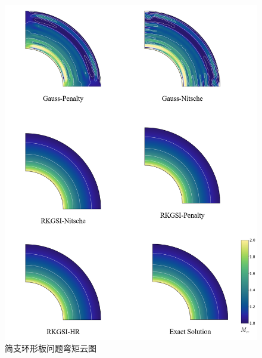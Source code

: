 \begin{figure}[H]
    \centering
    \includegraphics[scale=0.5]{figure/PHR/A/Mxy.png}
    \caption{简支环形板问题弯矩云图}\label{AMxy}
\end{figure}
